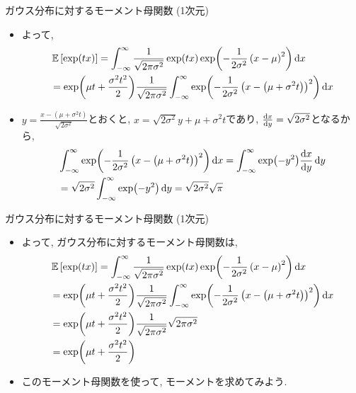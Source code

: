 \documentclass[dvipdfmx,notheorems,t]{beamer}
\begin{document}
\begin{frame}{ガウス分布に対するモーメント母関数 (1次元)}
\begin{itemize}
  \item よって,
  \begin{align*}
    & \operatorname{\mathbb{E}} \left[ \exp(tx) \right] = \int_{-\infty}^\infty \frac{1}{\sqrt{2\pi \sigma^2}} \exp(tx)
      \exp(-\frac{1}{2 \sigma^2} \left( x - \mu \right)^2) \dd{x} \\
      &= \exp(\mu t + \frac{\sigma^2 t^2}{2}) \frac{1}{\sqrt{2\pi \sigma^2}}
        \int_{-\infty}^\infty \exp(-\frac{1}{2 \sigma^2}
        \left( x - \left( \mu + \sigma^2 t \right) \right)^2) \dd{x}
  \end{align*}
  \item $y = \frac{x - \left( \mu + \sigma^2 t \right)}{\sqrt{2 \sigma^2}}$とおくと,
  $x = \sqrt{2 \sigma^2} y + \mu + \sigma^2 t$であり,
  $\dv{x}{y} = \sqrt{2 \sigma^2}$となるから,
  \begin{align*}
    & \int_{-\infty}^\infty \exp(-\frac{1}{2 \sigma^2}
      \left( x - \left( \mu + \sigma^2 t \right) \right)^2) \dd{x}
    = \int_{-\infty}^\infty \exp(-y^2) \dv{x}{y} \dd{y} \\
    &= \sqrt{2 \sigma^2} \int_{-\infty}^\infty \exp(-y^2) \dd{y}
    = \sqrt{2 \sigma^2} \sqrt{\pi}
  \end{align*}
\end{itemize}
\end{frame}

\begin{frame}{ガウス分布に対するモーメント母関数 (1次元)}
\begin{itemize}
  \item よって, ガウス分布に対するモーメント母関数は,
  \begin{align*}
    & \operatorname{\mathbb{E}} \left[ \exp(tx) \right] = \int_{-\infty}^\infty \frac{1}{\sqrt{2\pi \sigma^2}} \exp(tx)
      \exp(-\frac{1}{2 \sigma^2} \left( x - \mu \right)^2) \dd{x} \\
      &= \exp(\mu t + \frac{\sigma^2 t^2}{2}) \frac{1}{\sqrt{2\pi \sigma^2}}
        \int_{-\infty}^\infty \exp(-\frac{1}{2 \sigma^2}
        \left( x - \left( \mu + \sigma^2 t \right) \right)^2) \dd{x} \\
      &= \exp(\mu t + \frac{\sigma^2 t^2}{2}) \frac{1}{\sqrt{2\pi \sigma^2}}
        \sqrt{2\pi \sigma^2} \\
      &= \exp(\mu t + \frac{\sigma^2 t^2}{2})
  \end{align*}
  \item このモーメント母関数を使って, モーメントを求めてみよう.
\end{itemize}
\end{frame}
\end{document}
